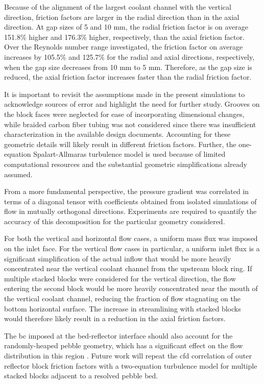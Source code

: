 Because of the alignment of the largest coolant channel with the vertical direction, friction factors are larger in the radial direction than in the axial direction. At gap sizes of 5 and 10 \si{\milli\meter}, the radial friction factor is on average 151.8\% higher and 176.3\% higher, respectively, than the axial friction factor. Over the Reynolds number range investigated, the friction factor on average increases by 105.5\% and 125.7\% for the radial and axial directions, respectively, when the gap size decreases from 10 \si{\milli\meter} to 5 \si{\milli\meter}. Therefore, as the gap size is reduced, the axial friction factor increases faster than the radial friction factor.

It is important to revisit the assumptions made in the present simulations to acknowledge sources of error and highlight the need for further study. Grooves on the block faces were neglected for ease of incorporating dimensional changes, while braided carbon fiber tubing was not considered since there was insufficient characterization in the available design documents. Accounting for these geometric details will likely result in different friction factors. Further, the one-equation Spalart-Allmaras turbulence model is used because of limited computational resources and the substantial geometric simplifications already assumed. 

From a more fundamental perspective, the pressure gradient was correlated in terms of a diagonal tensor with coefficients obtained from isolated simulations of flow in mutually orthogonal directions. Experiments are required to quantify the accuracy of this decomposition for the particular geometry considered. 

For both the vertical and horizontal flow cases, a uniform mass flux was imposed on the inlet face. For the vertical flow cases in particular, a uniform inlet flux is a significant simplification of the actual inflow that would be more heavily concentrated near the vertical coolant channel from the upstream block ring. If multiple stacked blocks were considered for the vertical direction, the flow entering the second block would  be more heavily concentrated near the mouth of the vertical coolant channel, reducing the fraction of flow stagnating on the bottom horizontal surface. The increase in streamlining with stacked blocks would therefore likely result in a reduction in the axial friction factors.

The \gls{bc} imposed at the bed-reflector interface should also account for the randomly-heaped pebble geometry, which has a significant effect on the flow distribution in this region \cite{amini}. Future work will repeat the \gls{cfd} correlation of outer reflector block friction factors with a two-equation turbulence model for multiple stacked blocks adjacent to a resolved pebble bed.

